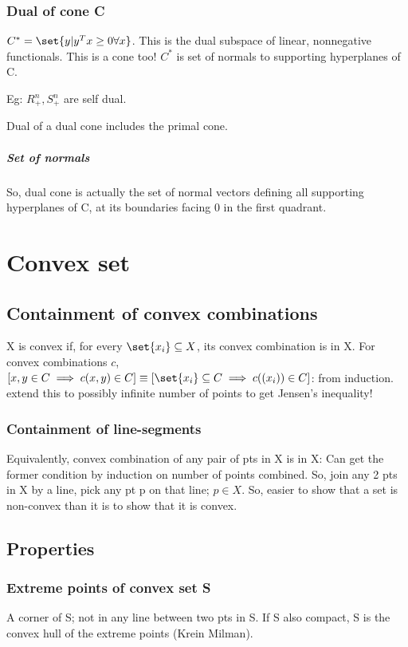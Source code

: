 \documentclass[oneside, article]{memoir}
\begin{document}
\subsection{Dual  of cone C}
$C^{*} = \set{y|y^{T}x \geq 0 \forall x}$. This is the dual subspace of linear, nonnegative functionals. This is a cone too! $C^{*}$ is set of normals to supporting hyperplanes of C.

Eg: $R_+^{n}, S_{+}^{n}$ are self dual.

Dual of a dual cone includes the primal cone.

\paragraph*{Set of normals}
So, dual cone is actually the set of normal vectors defining all supporting hyperplanes of C, at its boundaries facing 0 in the first quadrant.

\chapter{Convex set}
\section{Containment of convex combinations}
X is convex if, for every $\set{x_{i}} \subseteq X$, its convex combination is in X. For convex combinations $c$, $[x, y \in C \implies c(x, y) \in C] \equiv [\set{x_i} \subseteq C \implies c((x_i)) \in C]$: from induction. extend this to possibly infinite number of points to get Jensen's inequality!

\subsection{Containment of line-segments}
Equivalently, convex combination of any pair of pts in X is in X: Can get the former condition by induction on number of points combined. So, join any 2 pts in X by a line, pick any pt p on that line; $p \in X$. So, easier to show that a set is non-convex than it is to show that it is convex.

\section{Properties}
\subsection{Extreme points of convex set S}
A corner of S; not in any line between two pts in S. If S also compact, S is the convex hull of the extreme points (Krein Milman).
\end{document}
